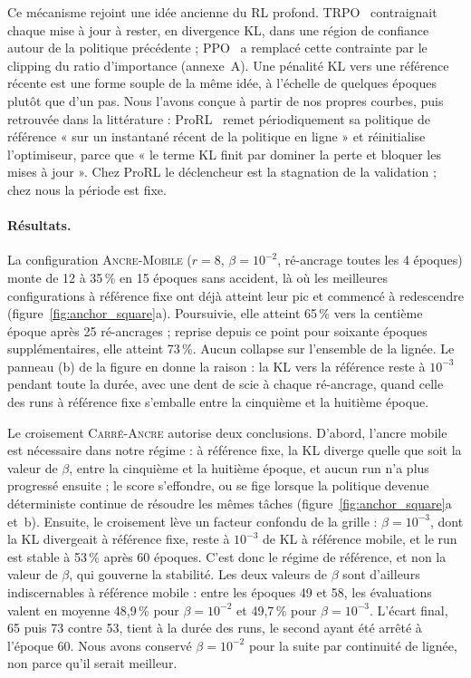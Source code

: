 \documentclass[11pt,a4paper]{article}
\begin{document}
Ce mécanisme rejoint une idée ancienne du RL profond. TRPO~\cite{schulman2015trpo} contraignait chaque mise à jour à rester, en divergence KL, dans une région de confiance autour de la politique précédente ; PPO~\cite{schulman2017proximal} a remplacé cette contrainte par le clipping du ratio d'importance (annexe~A). Une pénalité KL vers une référence récente est une forme souple de la même idée, à l'échelle de quelques époques plutôt que d'un pas. Nous l'avons conçue à partir de nos propres courbes, puis retrouvée dans la littérature : ProRL~\cite{liu2025prorl} remet périodiquement sa politique de référence « sur un instantané récent de la politique en ligne » et réinitialise l'optimiseur, parce que « le terme KL finit par dominer la perte et bloquer les mises à jour ». Chez ProRL le déclencheur est la stagnation de la validation ; chez nous la période est fixe.

\paragraph{Résultats.} La configuration \textsc{Ancre-Mobile} ($r=8$, $\beta=10^{-2}$, ré-ancrage toutes les 4 époques) monte de 12 à 35\,\% en 15 époques sans accident, là où les meilleures configurations à référence fixe ont déjà atteint leur pic et commencé à redescendre (figure~\ref{fig:anchor_square}a). Poursuivie, elle atteint 65\,\% vers la centième époque après 25 ré-ancrages ; reprise depuis ce point pour soixante époques supplémentaires, elle atteint 73\,\%. Aucun collapse sur l'ensemble de la lignée. Le panneau (b) de la figure en donne la raison : la KL vers la référence reste à $10^{-3}$ pendant toute la durée, avec une dent de scie à chaque ré-ancrage, quand celle des runs à référence fixe s'emballe entre la cinquième et la huitième époque.

Le croisement \textsc{Carré-Ancre} autorise deux conclusions. D'abord, l'ancre mobile est nécessaire dans notre régime : à référence fixe, la KL diverge quelle que soit la valeur de $\beta$, entre la cinquième et la huitième époque, et aucun run n'a plus progressé ensuite ; le score s'effondre, ou se fige lorsque la politique devenue déterministe continue de résoudre les mêmes tâches (figure~\ref{fig:anchor_square}a et~b). Ensuite, le croisement lève un facteur confondu de la grille : $\beta = 10^{-3}$, dont la KL divergeait à référence fixe, reste à $10^{-3}$ de KL à référence mobile, et le run est stable à 53\,\% après 60 époques. C'est donc le régime de référence, et non la valeur de $\beta$, qui gouverne la stabilité. Les deux valeurs de $\beta$ sont d'ailleurs indiscernables à référence mobile : entre les époques 49 et 58, les évaluations valent en moyenne 48{,}9\,\% pour $\beta=10^{-2}$ et 49{,}7\,\% pour $\beta=10^{-3}$. L'écart final, 65 puis 73 contre 53, tient à la durée des runs, le second ayant été arrêté à l'époque 60. Nous avons conservé $\beta=10^{-2}$ pour la suite par continuité de lignée, non parce qu'il serait meilleur.
\end{document}
